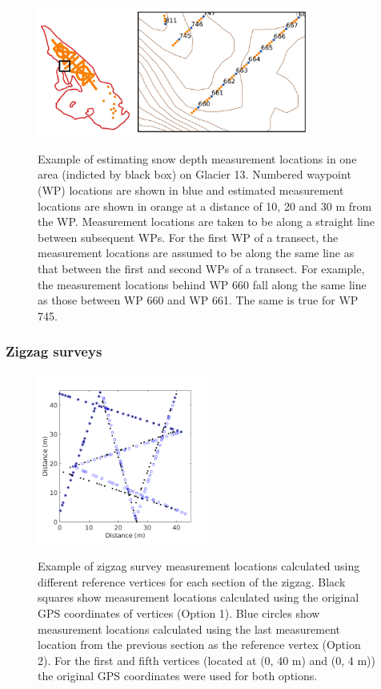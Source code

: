 \documentclass{sfuthesis}
\begin{document}
\begin{figure}[H]
	\centering
	\includegraphics[width = 0.8\textwidth]{transect_measure_locations.jpeg}\\
	\caption{Example of estimating snow depth measurement locations in one area (indicted by black box) on Glacier 13. Numbered waypoint (WP) locations are shown in blue and estimated measurement locations are shown in orange at a distance of 10, 20 and 30 m from the WP. Measurement locations are taken to be along a straight line between subsequent WPs. For the first WP of a transect, the measurement locations are assumed to be along the same line as that between the first and second WPs of a transect. For example, the measurement locations behind WP 660 fall along the same line as those between WP 660 and WP 661. The same is true for WP 745. }
	\label{fig:transect_measure_loc}
\end{figure}

\subsubsection{Zigzag surveys}

\begin{figure}
	\centering
	\includegraphics[width = 0.5\textwidth]{Zigzag_calOptions.png}\\
	\caption{Example of zigzag survey measurement locations calculated using different reference vertices for each section of the zigzag. Black squares show measurement locations calculated using the original GPS coordinates of vertices (Option 1). Blue circles show measurement locations calculated using the last measurement location from the previous section as the reference vertex (Option 2). For the first and fifth vertices (located at (0, 40 m) and (0, 4 m)) the original GPS coordinates were used for both options. }
	\label{fig:zigzag_location_options}
\end{figure}
\end{document}
